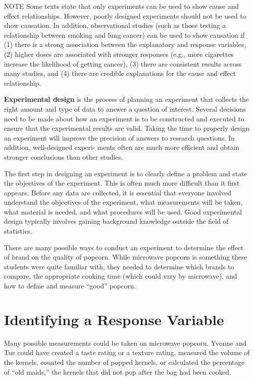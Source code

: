 \documentclass[
]{report}
\theoremstyle{definition}
\theoremstyle{definition}
\theoremstyle{definition}
\theoremstyle{definition}
\theoremstyle{remark}
\begin{document}
NOTE
Some texts state that only experiments can be used to show cause and effect relationships. However, poorly
designed experiments should not be used to show causation. In addition, observational studies (such as
those testing a relationship between smoking and lung cancer) can be used to show causation if (1) there is
a strong association between the explanatory and response variables, (2) higher doses are associated with
stronger responses (e.g., more cigarettes increase the likelihood of getting cancer), (3) there are consistent
results across many studies, and (4) there are credible explanations for the cause and effect relationship.

\textbf{Experimental design} is the process of planning an experiment that collects the right amount and type
of data to answer a question of interest. Several decisions need to be made about how an experiment is to be
constructed and executed to ensure that the experimental results are valid. Taking the time to properly design
an experiment will improve the precision of answers to research questions. In addition, well-designed experi-
ments often are much more efficient and obtain stronger conclusions than other studies.

The first step in designing an experiment is to clearly define a problem and state the objectives of the
experiment. This is often much more difficult than it first appears. Before any data are collected, it is essential
that everyone involved understand the objectives of the experiment, what measurements will be taken, what
material is needed, and what procedures will be used. Good experimental design typically involves gaining
background knowledge outside the field of statistics.

There are many possible ways to conduct an experiment to determine the effect of brand on the quality
of popcorn. While microwave popcorn is something these students were quite familiar with, they needed to
determine which brands to compare, the appropriate cooking time (which could vary by microwave), and how
to define and measure ``good'' popcorn.

\hypertarget{identifying-a-response-variable}{%
\section{Identifying a Response Variable}\label{identifying-a-response-variable}}

Many possible measurements could be taken on microwave popcorn. Yvonne and Tue could have created a
taste rating or a texture rating, measured the volume of the kernels, counted the number of popped kernels, or
calculated the percentage of ``old maids,'' the kernels that did not pop after the bag had been cooked.
\end{document}
